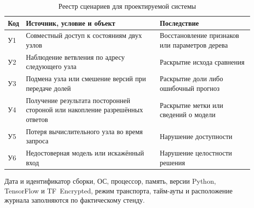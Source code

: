 \label{app:threats}

\begin{table}[htbp]
\caption{Реестр сценариев для проектируемой системы}
\centering\small
\begin{tabularx}{\linewidth}{|p{.08\linewidth}|X|X|}
\hline
Код & Источник, условие и объект & Последствие \\ \hline
У1 & Совместный доступ к состояниям двух узлов & Восстановление признаков или параметров дерева \\ \hline
У2 & Наблюдение ветвления по адресу следующего узла & Раскрытие исхода сравнения \\ \hline
У3 & Подмена узла или смешение версий при передаче долей & Раскрытие доли либо ошибочный прогноз \\ \hline
У4 & Получение результата посторонней стороной или накопление разрешённых ответов & Раскрытие метки или сведений о модели \\ \hline
У5 & Потеря вычислительного узла во время запроса & Нарушение доступности \\ \hline
У6 & Недостоверная модель или искажённый вход & Нарушение целостности решения \\ \hline
\end{tabularx}
\end{table}

\label{app:env}

Дата и идентификатор сборки, ОС, процессор, память, версии Python, TensorFlow и TF~Encrypted, режим транспорта, тайм-ауты и расположение журнала заполняются по фактическому стенду.
